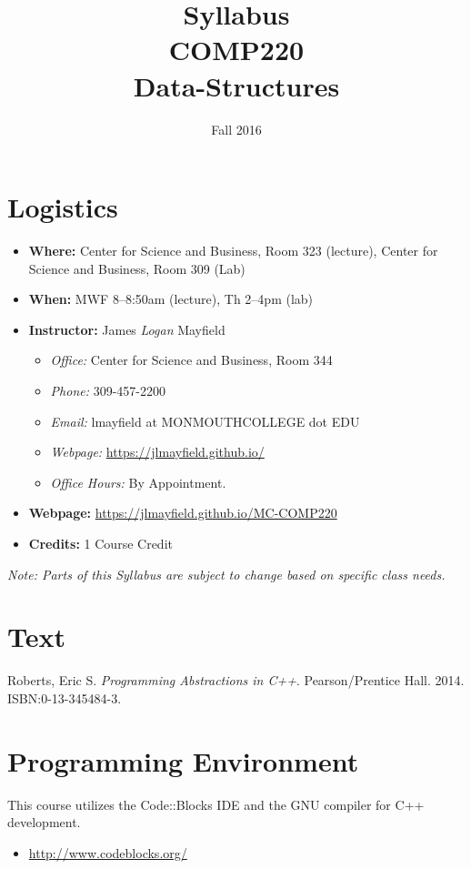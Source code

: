 \documentclass[10pt]{article}
\title{Syllabus \\ COMP220 \\ Data-Structures}
\author{ }
\date{Fall 2016}
\begin{document}
\maketitle

\section{Logistics}
\begin{itemize}
\item \textbf{Where: } Center for Science and Business, Room 323 (lecture), Center for Science and Business, Room 309 (Lab)
\item \textbf{When: } MWF 8--8:50am (lecture), Th 2--4pm (lab)
\item \textbf{Instructor: } James \textit{Logan} Mayfield
\begin{itemize}
\item \textit{Office: } Center for Science and Business, Room 344
\item \textit{Phone: } 309-457-2200 %
\item \textit{Email: } lmayfield at MONMOUTHCOLLEGE dot EDU
\item \textit{Webpage: } \url{https://jlmayfield.github.io/}
\item \textit{Office Hours: }   By Appointment.
\end{itemize}
\item \textbf{Webpage: } \url{https://jlmayfield.github.io/MC-COMP220}
\item \textbf{Credits: } 1 Course Credit
\end{itemize}
\emph{Note: Parts of this Syllabus are subject to change based on specific class needs.}

\section{Text}
\noindent
Roberts, Eric S\@. \textit{Programming Abstractions in C++}. Pearson/Prentice Hall. 2014. ISBN:0-13-345484-3. %


\section{Programming Environment}

This course utilizes the Code::Blocks IDE and the GNU compiler for C++ development.
\begin{itemize}
\item \url{http://www.codeblocks.org/}
\end{itemize}
\end{document}

